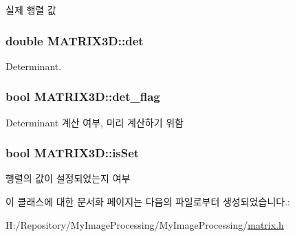 실제 행렬 값 

\hypertarget{class_m_a_t_r_i_x3_d_a836b104900b7c16a92bda6e41612a77d}{
\subsubsection[{det}]{\setlength{\rightskip}{0pt plus 5cm}double M\-A\-T\-R\-I\-X3\-D\-::det\hspace{0.3cm}{\ttfamily [private]}}}\label{class_m_a_t_r_i_x3_d_a836b104900b7c16a92bda6e41612a77d}


Determinant. 

\hypertarget{class_m_a_t_r_i_x3_d_ab951cbc695222c9cd96d1f2990b1a662}{
\subsubsection[{det\-\_\-flag}]{\setlength{\rightskip}{0pt plus 5cm}bool M\-A\-T\-R\-I\-X3\-D\-::det\-\_\-flag\hspace{0.3cm}{\ttfamily [private]}}}\label{class_m_a_t_r_i_x3_d_ab951cbc695222c9cd96d1f2990b1a662}


Determinant 계산 여부, 미리 계산하기 위함 

\hypertarget{class_m_a_t_r_i_x3_d_a3d3bd9c2ee0c213ca2f69804c3db6ac6}{
\subsubsection[{is\-Set}]{\setlength{\rightskip}{0pt plus 5cm}bool M\-A\-T\-R\-I\-X3\-D\-::is\-Set\hspace{0.3cm}{\ttfamily [private]}}}\label{class_m_a_t_r_i_x3_d_a3d3bd9c2ee0c213ca2f69804c3db6ac6}


행렬의 값이 설정되었는지 여부 



이 클래스에 대한 문서화 페이지는 다음의 파일로부터 생성되었습니다.\-:\begin{DoxyCompactItemize}
\item 
H\-:/\-Repository/\-My\-Image\-Processing/\-My\-Image\-Processing/\hyperlink{matrix_8h}{matrix.\-h}\end{DoxyCompactItemize}
